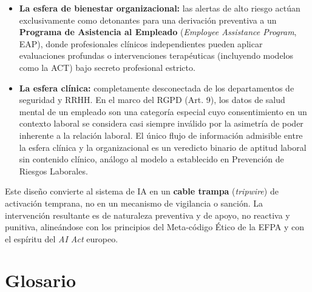 \documentclass[IB]{TFUOC}%
\begin{document}
\begin{enumerate}
\begin{itemize}
        \item \textbf{La esfera de bienestar organizacional:} las alertas de alto riesgo actúan exclusivamente como detonantes para una derivación preventiva a un \textbf{Programa de Asistencia al Empleado} (\textit{Employee Assistance Program}, EAP), donde profesionales clínicos independientes pueden aplicar evaluaciones profundas o intervenciones terapéuticas (incluyendo modelos como la ACT) bajo secreto profesional estricto.
        
        \item \textbf{La esfera clínica:} completamente desconectada de los departamentos de seguridad y RRHH. 
        En el marco del RGPD (Art. 9), los datos de salud mental de un empleado son una categoría especial cuyo consentimiento en un contexto laboral se considera casi siempre inválido por la asimetría de poder inherente a la relación laboral. El único flujo de información admisible entre la esfera clínica y la organizacional es un veredicto binario de aptitud laboral sin contenido clínico, análogo al modelo a establecido en Prevención de Riesgos Laborales.
    \end{itemize}
    
    \noindent Este diseño convierte al sistema de IA en un \textbf{cable trampa} (\textit{tripwire}) de activación temprana, no en un mecanismo de vigilancia o sanción. 
    La intervención resultante es de naturaleza preventiva y de apoyo, no reactiva y punitiva, alineándose con los principios del Meta-código Ético de la EFPA y con el espíritu del \textit{AI Act} europeo.

\end{enumerate}


\chapter{Glosario}
\end{document}
